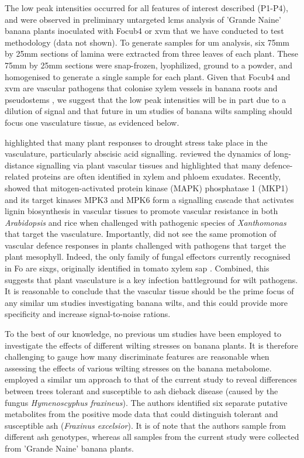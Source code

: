 \bigskip
\noindent
The low peak intensities occurred for all features of interest described (P1-P4), and were observed in preliminary untargeted \ac{lcms} analysis of 'Grande Naine' banana plants inoculated with \ac{Focub4} or \ac{xvm} that we have conducted to test methodology (data not shown). To generate samples for \ac{um} analysis, six 75mm by 25mm sections of lamina were extracted from three leaves of each plant. These 75mm by 25mm sections were snap-frozen, lyophilized, ground to a powder, and homogenised to generate a single sample for each plant. Given that \ac{Focub4} and \ac{xvm} are vascular pathogens that colonise xylem vessels in banana roots and pseudostems \parencite{Li2011, Pegg2019}, we suggest that the low peak intensities will be in part due to a dilution of signal and that future in \ac{um} studies of banana wilts sampling should focus one vasculature tissue, as evidenced below. 

\textcite{Takahashi2020} highlighted that many plant responses to drought stress take place in the vasculature, particularly abscisic acid signalling. \textcite{Notaguchi2015} reviewed the dynamics of long-distance signalling via plant vascular tissues and highlighted that many defence-related proteins are often identified in xylem and phloem exudates. Recently, \textcite{Lin2022} showed that mitogen-activated protein kinase (MAPK) phosphatase 1 (MKP1) and its target kinases MPK3 and MPK6 form a signalling cascade that activates lignin biosynthesis in vascular tissues to promote vascular resistance in both \textit{Arabidopsis} and rice when challenged with pathogenic species of \textit{Xanthomonas} that target the vasculature. Importantly, \textcite{Lin2022} did not see the same promotion of vascular defence responses in plants challenged with pathogens that target the plant mesophyll. Indeed, the only family of fungal effectors currently recognised in \ac{Fo} are \acfp{sixg}, originally identified in tomato xylem sap \parencite{Houterman2007}. Combined, this suggests that plant vasculature is a key infection battleground for wilt pathogens. It is reasonable to conclude that the vascular tissue should be the prime focus of any similar \ac{um} studies investigating banana wilts, and this could provide more specificity and increase signal-to-noise rations. 

\bigskip
\noindent
To the best of our knowledge, no previous \ac{um} studies have been employed to investigate the effects of different wilting stresses on banana plants. It is therefore challenging to gauge how many discriminate features are reasonable when assessing the effects of various wilting stresses on the banana metabolome. \textcite{Sambles2017} employed a similar \ac{um} approach to that of the current study to reveal differences between trees tolerant and susceptible to ash dieback disease (caused by the fungus \textit{Hymenoscyphus fraxineus}). The authors identified six separate putative metabolites from the positive mode data that could distinguish tolerant and susceptible ash (\textit{Fraxinus excelsior}). It is of note that the authors sample from different ash genotypes, whereas all samples from the current study were collected from 'Grande Naine' banana plants. 

